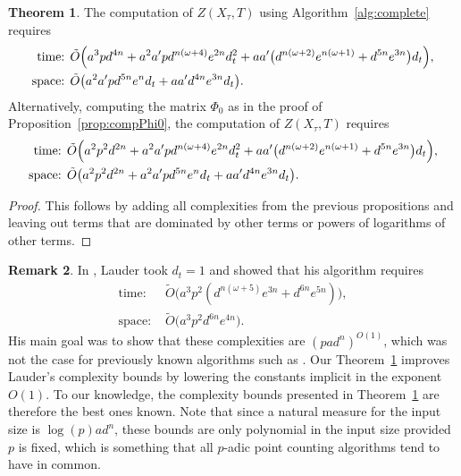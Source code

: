 \documentclass[a4paper,11pt]{article}
\numberwithin{equation}{section}
\providecommand{\BigOh}{O}          %
\providecommand{\SoftOh}{\tilde{O}} %
\theoremstyle{definition}
\newtheorem{thm}{Theorem}[section]
\newtheorem{rem}[thm]{Remark}
\begin{document}
\begin{thm} \label{thm:totalcomplexity}
The computation of $Z(X_{\tau},T)$ using Algorithm~\ref{alg:complete} requires
\begin{align*}
\mbox{time: }  &\SoftOh\Bigl( 
                a^3 p d^{4n} + 
                a^2 a' p d^{n(\omega+4)} e^{2n} d_t^2+
                aa' \bigl(d^{n(\omega+2)} e^{n(\omega+1)}+ d^{5n} e^{3n}\bigr) d_t 
                \Bigr), \\
\mbox{space: } &\SoftOh\bigl( a^2 a' p d^{5n} e^n d_t + a a' d^{4n} e^{3n} d_t \bigr).
\end{align*}
Alternatively, computing the matrix $\Phi_0$ as in the proof of Proposition~\ref{prop:compPhi0}, 
the computation of $Z(X_{\tau},T)$ requires
\begin{align*}
\mbox{time: }  &\SoftOh\Bigl( 
                a^2 p^2 d^{2n} + 
                a^2 a' p d^{n(\omega+4)} e^{2n} d_t^2+
                aa' \bigl(d^{n(\omega+2)} e^{n(\omega+1)}+ d^{5n} e^{3n}\bigr) d_t 
                \Bigr), \\
\mbox{space: } &\SoftOh\bigl( 
                a^2 p^2 d^{2n} + 
                a^2 a' p d^{5n} e^n d_t + 
                a a' d^{4n} e^{3n} d_t \bigr).
\end{align*}
\end{thm}

\begin{proof}
This follows by adding all complexities from the previous propositions and 
leaving out terms that are dominated by other terms or powers of
logarithms of other terms.
\end{proof}

\begin{rem} In \citep{Lauder2004a}, Lauder took $d_t=1$ and showed that his
algorithm requires
\begin{align*}
\mbox{time: }  &\SoftOh\bigl(a^3 p^2 (d^{n(\omega+5)} e^{3n} + d^{6n} e^{5n}) \bigr), \\ 
\mbox{space: } &\SoftOh\bigl(a^3 p^2 d^{6n} e^{4n} \bigr).
\end{align*}
His main goal was to show that these complexities are $(pad^n)^{\BigOh(1)}$, 
which was not the case for previously known algorithms such as 
\citep{AbbottKedlayaRoe2006, LauderWan2008}. 
Our Theorem~\ref{thm:totalcomplexity} improves Lauder's complexity bounds 
by lowering the constants implicit in the exponent~$\BigOh(1)$.  To our 
knowledge, the complexity bounds presented in Theorem~\ref{thm:totalcomplexity} 
are therefore the best ones known.  Note that since a natural measure for the 
input size is $\log(p) a d^n$, these bounds are only polynomial in the 
input size provided $p$ is fixed, which is something that all $p$-adic 
point counting algorithms tend to have in common.
\end{rem}
\end{document}
